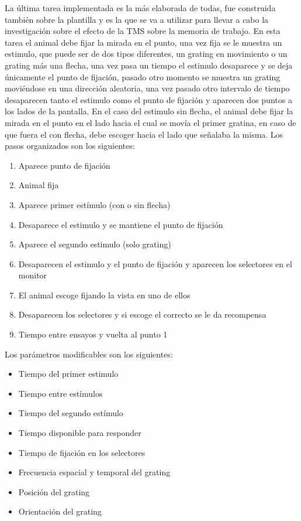 \documentclass[conference]{IEEEtran}
\begin{document}
La última tarea implementada es la más elaborada de todas, fue construida también sobre la plantilla y es la que se va a utilizar para llevar a cabo la investigación sobre el efecto de la TMS sobre la memoria de trabajo. 
En esta tarea el animal debe fijar la mirada en el punto, una vez fija se le muestra un estimulo, que puede ser de dos tipos diferentes, un grating en movimiento o un grating más una flecha, una vez pasa un tiempo el estimulo desaparece y se deja únicamente el punto de fijación, pasado otro momento se muestra un grating moviéndose en una dirección aleatoria, una vez pasado otro intervalo de tiempo desaparecen tanto el estimulo como el punto de fijación y aparecen dos puntos a los lados de la pantalla. En el caso del estimulo sin flecha, el animal debe fijar la mirada en el punto en el lado hacia el cual se movía el primer gratina, en caso de que fuera el con flecha, debe escoger  hacia el lado que señalaba la misma.
Los pasos organizados son los siguientes:


\begin{enumerate}
	\item Aparece punto de fijación
	\item Animal fija
	\item Aparece primer estímulo (con o sin flecha)
	\item Desaparece el estimulo y se mantiene el punto de fijación
	\item Aparece el segundo estimulo (solo grating)
	\item Desaparecen el estimulo y el punto de fijación y aparecen los selectores en el monitor
	\item El animal escoge fijando la vista en uno de ellos
	\item Desaparecen los selectores y si escoge el correcto se le da recompensa
	\item Tiempo entre ensayos y vuelta al punto 1
\end{enumerate}


Los parámetros modificables son los siguientes:

\begin{itemize}
	\item Tiempo del primer estimulo
	\item Tiempo entre estímulos
	\item Tiempo del segundo estímulo
	\item Tiempo disponible para responder
	\item Tiempo de fijación en los selectores
	\item Frecuencia espacial y temporal del grating
	\item Posición del grating
	\item Orientación del grating

\end{itemize}
\end{document}

